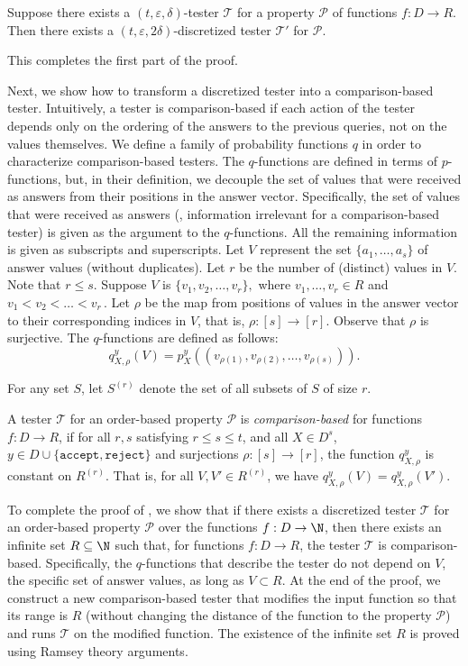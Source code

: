 \documentclass{toc}
\newcommand{\eps}{\varepsilon}
\newcommand{\cP}{\ensuremath{\mathcal{P}}}
\newcommand{\cT}{\ensuremath{\mathcal{T}}}
\newcommand{\Thm}[1]{\expref{Theorem}{thm:#1}}
\begin{document}
\begin{lemma} \label{lem:disc-test}
Suppose there exists a $(t,\eps,\delta)$-tester $\cT$ for a property $\cP$ of functions $f:D \to R$.
Then there exists a $(t,\eps,2\delta)$-discretized tester $\cT'$ for $\cP$.
\end{lemma}

This completes the first part of the proof.

Next, we show how to transform a discretized tester into a comparison-based tester.
Intuitively, a tester is comparison-based if each action of the tester depends only on the ordering of the answers to the previous queries, not on the values themselves.
We define a family of probability functions $q$ in order to characterize comparison-based testers.
The $q$-functions are defined in terms of $p$-functions, but, in their definition, we decouple the set of values that were received as answers from their positions in the answer vector. Specifically, the set of values that were received as answers (\ie, information irrelevant for
a %
comparison-based tester) is given as the argument to the $q$-functions. All the remaining information is given as subscripts and superscripts.
Let $V$ represent the set $\{a_1, \ldots, a_s\}$ of answer values (without duplicates).
Let $r$ be the number of (distinct) values in $V$. Note that $r \leq s$.
Suppose $V$ is $\{v_1, v_2, \ldots, v_r\},$ where $v_1, \ldots, v_r \in R$ 
and $v_1 < v_2 < \ldots < v_r$\,. %
Let $\rho$ be the map from positions of values in the answer vector to their corresponding indices in $V$, that is, $\rho:[s] \to [r]$. Observe that $\rho$ is surjective.
The $q$-functions are defined as follows:
\[q_{X,\rho}^y(V) = p_X^y((v_{\rho(1)}, v_{\rho(2)}, \ldots,v_{\rho(s)})).\]


For any set $S$, let $S^{(r)}$ denote the set of all subsets of $S$ of size $r$.

\begin{definition} \label{def:cbt}
A tester $\cT$ for an order-based property $\cP$ is \emph{comparison-based} for functions $f:D \to R$, if for all $r,s$ satisfying $ r \leq s \leq t$, and all $X \in D^s$, $y \in D \cup \{\texttt{accept}, \texttt{reject}\}$ and surjections $\rho:[s] \to [r]$, the function $q_{X,\rho}^y$ is constant on $R^{(r)}$. That is, for all $V, V' \in R^{(r)}$, we have $q_{X,\rho}^y(V) = q_{X,\rho}^y(V')$.
\end{definition}

To complete the proof of \Thm{CS14}, we show that if there exists a discretized tester $\cT$ for an order-based property $\cP$ over the functions $f:D \to \N$, then there exists an infinite set $R \subseteq \N$ such that, for functions $f:D \to R$, the tester $\cT$ is comparison-based. Specifically, the $q$-functions that describe the tester do not depend on $V$, the specific set of answer values, as long as $V\subset R$. At the end of the proof, we construct a new comparison-based tester that modifies the input function so that its range is $R$ (without changing the distance of the function to the property $\cP$) and runs $\cT$ on the modified function.
The existence of the infinite set $R$ is proved using Ramsey theory arguments.
\end{document}
